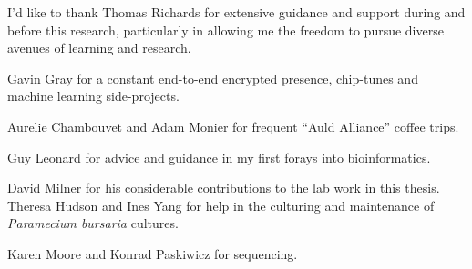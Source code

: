 
I'd like to thank Thomas Richards for extensive guidance and support during and before this research,
particularly in allowing me the freedom to pursue diverse avenues of learning and research.

Gavin Gray for a constant end-to-end encrypted presence, chip-tunes and machine learning side-projects.

Aurelie Chambouvet and Adam Monier for frequent ``Auld Alliance'' coffee trips.

Guy Leonard for advice and guidance in my first forays into bioinformatics. 

David Milner for his considerable contributions to the lab work in this thesis.
Theresa Hudson and Ines Yang for help in the culturing and maintenance of 
\textit{Paramecium bursaria} cultures. 

Karen Moore and Konrad Paskiwicz for sequencing. 

